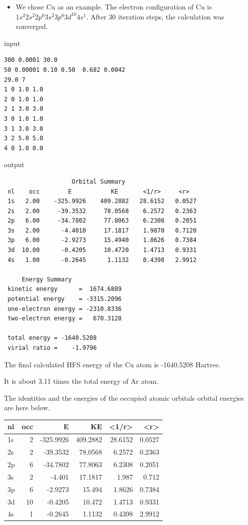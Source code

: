 \documentclass[11pt]{article}
\begin{document}
\begin{itemize}
\item We chose Cu as an example. The electron configuration of Cu is \(1s^{2} 2s^{2} 2p^{6} 3s^{2} 3p^{6} 3d^{10} 4s^{1}\). After 30 iteration steps, the calculation was converged.
\end{itemize}

input
\begin{verbatim}
300 0.0001 30.0
50 0.00001 0.10 0.50  0.682 0.0042
29.0 7
1 0 1.0 1.0
2 0 1.0 1.0
2 1 3.0 3.0
3 0 1.0 1.0
3 1 3.0 3.0
3 2 5.0 5.0
4 0 1.0 0.0
\end{verbatim}


output
\begin{verbatim}
                   Orbital Summary
 nl    occ        E           KE       <1/r>     <r>
 1s   2.00    -325.9926    409.2882   28.6152   0.0527
 2s   2.00     -39.3532     78.0568    6.2572   0.2363
 2p   6.00     -34.7802     77.8063    6.2308   0.2051
 3s   2.00      -4.4010     17.1817    1.9870   0.7120
 3p   6.00      -2.9273     15.4940    1.8626   0.7384
 3d  10.00      -0.4205     10.4720    1.4713   0.9331
 4s   1.00      -0.2645      1.1132    0.4398   2.9912

     Energy Summary
 kinetic energy      =  1674.6889
 potential energy    = -3315.2096
 one-electron energy = -2310.8336
 two-electron energy =   670.3128

 total energy = -1640.5208
 virial ratio =    -1.9796
\end{verbatim}


The final calculated HFS energy of the Cu atom is -1640.5208 Hartree.

It is about 3.11 times the total energy of Ar atom.

The identities and the energies of the occupied atomic orbitals orbital energies are here below.

\begin{center}
\begin{tabular}{lrrrrr}
nl & occ & E & KE & <1/r> & <r>\\
\hline
1s & 2 & -325.9926 & 409.2882 & 28.6152 & 0.0527\\
2s & 2 & -39.3532 & 78.0568 & 6.2572 & 0.2363\\
2p & 6 & -34.7802 & 77.8063 & 6.2308 & 0.2051\\
3s & 2 & -4.401 & 17.1817 & 1.987 & 0.712\\
3p & 6 & -2.9273 & 15.494 & 1.8626 & 0.7384\\
3d & 10 & -0.4205 & 10.472 & 1.4713 & 0.9331\\
4s & 1 & -0.2645 & 1.1132 & 0.4398 & 2.9912\\
\end{tabular}
\end{center}
\end{document}
